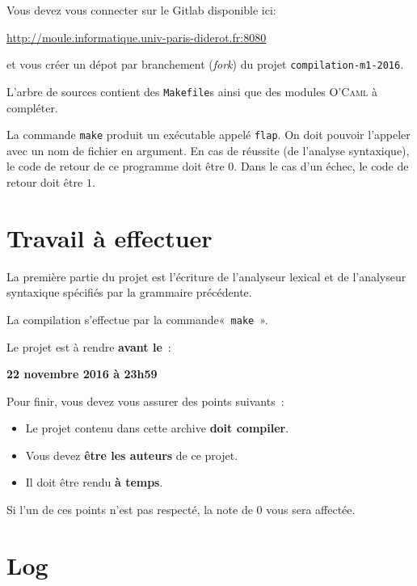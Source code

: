 \documentclass[a4paper,8pt]{article}
\newlength\codewidth
\newenvironment{code}[1][\codewidth]{
\begin{center}
\Sbox
\hspace{0.3cm}\minipage{#1}\small
}{
\endminipage
\endSbox\fbox{\TheSbox}
\end{center}
}
\begin{document}
Vous devez vous connecter sur le Gitlab disponible ici:
\begin{center}
\url{http://moule.informatique.univ-paris-diderot.fr:8080}
\end{center}

et vous créer un dépot par branchement (\textit{fork}) du projet \verb!compilation-m1-2016!.

L'arbre de sources contient des \verb!Makefile!s ainsi que des modules
\textsc{O'Caml} à compléter.

La commande \verb!make! produit un exécutable appelé \verb!flap!. On
doit pouvoir l'appeler avec un nom de fichier en argument. En cas
de réussite (de l'analyse syntaxique), le code de retour de
ce programme doit être $0$. Dans le cas d'un échec, le code
de retour doit être $1$.

\section{Travail à effectuer}

La première partie du projet est l'écriture de l'analyseur lexical et
de l'analyseur syntaxique spécifiés par la grammaire précédente.

La compilation s'effectue par la commande«~\verb!make!~».

Le projet est à rendre \textbf{avant le}~:

\begin{code}
\begin{center}
\large\textbf{22 novembre 2016 à 23h59}
\end{center}
\end{code}

Pour finir, vous devez vous assurer des points suivants~:
\begin{code}
\begin{itemize}
\item Le projet contenu dans cette archive \textbf{doit compiler}.
\item Vous devez \textbf{être les auteurs} de ce projet.
\item Il doit être rendu \textbf{à temps}.
\end{itemize}
\end{code}

Si l'un de ces points n'est pas respecté, la note de $0$ vous sera affectée.

\section{Log}


\end{document}
